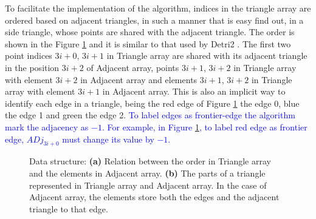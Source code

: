 To facilitate the implementation of the algorithm, indices in the triangle array are ordered based on adjacent triangles, in such a manner that is easy find out, in a side triangle, whose points are shared with the adjacent triangle.  The order is shown in the Figure \ref{figs:data_and_triangle} and it is similar to that used by Detri2 \cite{Detri2}. The first two point indices $3i+0$, $3i+1$ in Triangle array are shared with its adjacent triangle in the position $3i+2$ of Adjacent array, points $3i+1$, $3i+2$ in Triangle array with element $3i+2$ in Adjacent array and elements $3i+1$, $3i+2$ in Triangle array with element $3i+1$ in Adjacent array. This is also an implicit way to identify each edge in a triangle, being the red edge of Figure \ref{figs:data_and_triangle} the edge 0, blue the edge 1 and green the edge 2.  \textcolor{blue}{To label edges as frontier-edge the algorithm mark the adjacency as $-1$. For example, in Figure \ref{figs:data_and_triangle}, to label red edge as frontier edge, $ADj_{3i+0}$ must change its value by $-1$. }

\begin{figure}
\centering     %
{}\hspace{2cm}
\caption{Data structure:  \textbf{(a)} Relation between the order in Triangle array and the elements in Adjacent array. \textbf{(b)} The parts of a triangle represented in Triangle array and Adjacent array. In the case of Adjacent array, the elements store both the edges and  the adjacent triangle to that edge.}
\label{figs:data_and_triangle} 
\end{figure}




